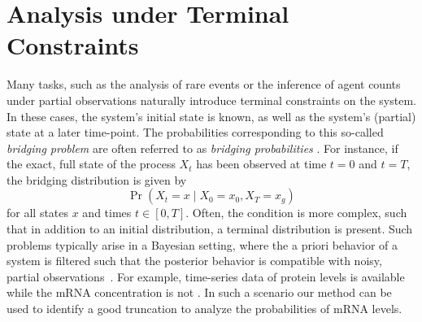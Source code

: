 \chapter{Analysis under Terminal Constraints}\label{ch:bridging}
Many tasks, such as the analysis of rare events or the inference of agent counts under partial observations naturally introduce terminal constraints on the system.
In these cases, the system's initial state is known, as well as the system's (partial) state at a later time-point.
The probabilities corresponding to this so-called \emph{bridging problem} are often referred to as \emph{bridging probabilities} \cite{golightly2019efficient,golightly2011bayesian}.
For instance, if the exact, full state of the process $X_t$ has been observed at time $t=0$ and $t=T$, the bridging distribution is given by
\[
\Pr(X_t=x\mid X_{0}=x_{0},X_{T}=x_g)
\]
for all states $x$ and times $t\in [0,T]$.
Often, the condition is more complex, such that in addition to an initial distribution, a terminal distribution is present.
Such problems typically arise in a Bayesian setting, where the a priori behavior of a system is filtered such that the posterior behavior is compatible with noisy, partial observations~\cite{broemeling2017bayesian,huang2016reconstructing}.
For example, time-series data of protein levels is available while the mRNA concentration is not  \cite{adan2017flow,huang2016reconstructing}.
In such a scenario our method can be used to identify a good truncation to analyze the probabilities of mRNA levels.


